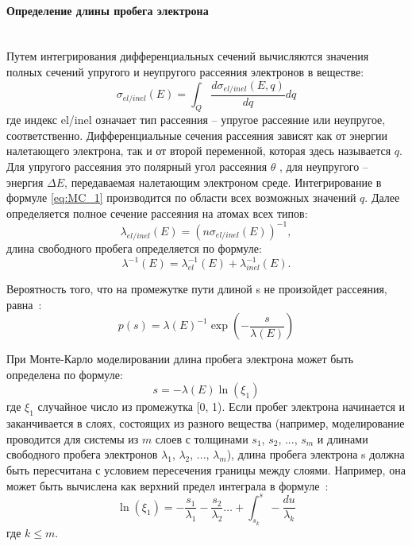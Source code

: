 \paragraph{Определение длины пробега электрона} \mbox{} \\
\indent Путем интегрирования дифференциальных сечений вычисляются значения полных сечений упругого и неупругого рассеяния электронов в веществе:
\begin{equation} \label{eq:MC_1}
	\sigma_{el/inel}(E) = \int_Q \frac{d \sigma_{el/inel}(E, q)}{dq} dq
\end{equation}
где индекс \textquotedbl el/inel\textquotedbl{} означает тип рассеяния -- упругое рассеяние или неупругое, соответственно. Дифференциальные сечения рассеяния зависят как от энергии налетающего электрона, так и от второй переменной, которая здесь называется $q$. Для упругого рассеяния это полярный угол рассеяния $\theta$ , для неупругого -- энергия $\Delta E$, передаваемая налетающим электроном среде. Интегрирование в формуле \ref{eq:MC_1} производится по области всех возможных значений $q$. Далее определяется полное сечение рассеяния на атомах всех типов:
\begin{equation} \label{eq:MC_3}
	\lambda_{el/inel}(E)=\left(n \sigma_{el/inel}(E)\right)^{-1},
\end{equation}
длина свободного пробега определяется по формуле:
\begin{equation} \label{eq:MC_4}
	\lambda^{-1}(E) = \lambda_{el}^{-1}(E)+\lambda_{inel}^{-1}(E).
\end{equation}

Вероятность того, что на промежутке пути длиной s не произойдет рассеяния, равна~\cite{ME_rev_49}:
\begin{equation} \label{eq:MC_5}
	p(s) = \lambda(E)^{-1} \exp \left(-\frac{s}{\lambda(E)}\right)
\end{equation}

При Монте-Карло моделировании длина пробега электрона может быть определена по формуле:
\begin{equation} \label{eq:MC_6}
	s = -\lambda(E) \ln \left(\xi_1\right)
\end{equation}
где $\xi_1$ случайное число из промежутка [0, 1). Если пробег электрона начинается и заканчивается в слоях, состоящих из разного вещества (например, моделирование проводится для системы из $m$ слоев с толщинами $s_1$, $s_2$, ..., $s_m$ и длинами свободного пробега электронов $\lambda_1$, $\lambda_2$, ..., $\lambda_m$), длина пробега электрона s должна быть пересчитана с условием пересечения границы между слоями. Например, она может быть вычислена как верхний предел интеграла в формуле~\cite{Han_2002}:
\begin{equation} \label{eq:MC_7}
	\ln \left(\xi_1\right)=-\frac{s_1}{\lambda_1}-\frac{s_2}{\lambda_2} \ldots+\int_{s_k}^s-\frac{d u}{\lambda_k}
\end{equation}
где $k \leq m$.


